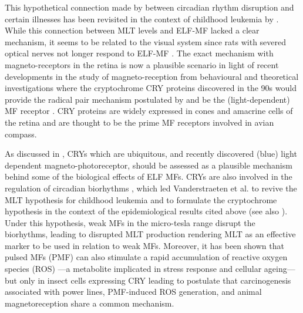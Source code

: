\documentclass[letter]{article}
\begin{document}
 This hypothetical connection made by \citet{Stevens1996} between    circadian rhythm disruption and certain illnesses 
has been revisited in the context of childhood leukemia by \citet{Henshaw2005}. 
While this connection between MLT levels and ELF-MF lacked a clear mechanism, it seems to be related to the visual system since rats
with severed optical nerves not longer respond to ELF-MF \citep{Olcese1985}. The exact mechanism with magneto-receptors in the retina is now
a plausible scenario in light of recent developments in the study of magneto-reception from behavioural 
\citep[e.g.][]{Bazalova2016,Gegear2008,Johnsen2005,kirschvink1991,Phillips1992,Ritz2004,Ritz2009, Malkemper2015,Sherrard2018,Wiltschko2005,Winklhofer2013,Wiltschko2014,Wiltschko2016,Yoshii2009}
and  theoretical investigations \citep[e.g.][]{Hore2016,Ritz2010}
where the cryptochrome CRY proteins discovered in the 90s  \citep{Ahmad1993,Ahmad2007,Ahmad1999,Ahmad2016,Chasmore1999,Chaves2011} would provide the radical pair mechanism postulated by \citet{Schulten1978} and
be the (light-dependent) MF receptor 
 \citep{Hore2016,Liedvogel2010,Michael2017,Ritz2010b}.   
 CRY proteins are widely expressed in cones and amacrine cells of the retina \citep[e.g.][]{Foley2011,Wong2018} and are thought to be the prime MF receptors  involved in avian compass.
 
 As discussed in \citet{Lagroye2011}, CRYs which are ubiquitous, and   recently discovered (blue) light dependent magneto-photoreceptor,  should be assessed as a plausible mechanism behind some of the biological effects of ELF MFs.
 CRYs are also involved in the regulation of circadian biorhythms  \citep[e.g.][]{vanderHorst1999,Yoshii2009,Ono2013,Wong2018}, which led Vanderstraeten et al. 
 \citep{Vanderstraeten2012,Vanderstraeten2012a,Vanderstraeten2015,Vanderstraeten2017} to revive the MLT hypothesis for childhood leukemia
 and to formulate the cryptochrome hypothesis   in the context of the epidemiological results cited above (see also \citet{Lagroye2011,Juutilainen2018}). Under this hypothesis,
weak MFs in the micro-tesla range disrupt the biorhythms, leading to disrupted MLT production rendering MLT as an effective marker  to be used in relation to weak MFs.  Moreover, it has been shown that pulsed MFs (PMF) can also stimulate a rapid accumulation of reactive oxygen species (ROS) ---a  metabolite implicated in stress response and cellular ageing--- but  only in insect cells expressing CRY \citep{Sherrard2018} leading \citet{Landler2018} to postulate that  carcinogenesis associated with power lines, PMF-induced ROS generation, and animal magnetoreception share a common mechanism.
\end{document}
